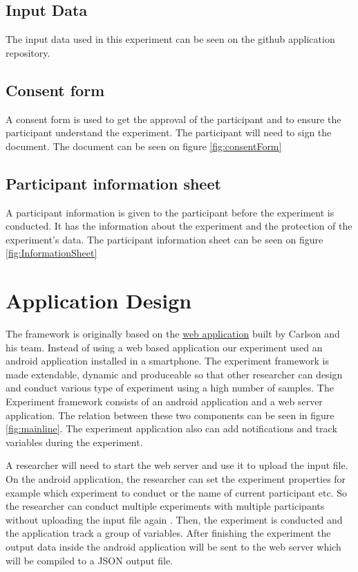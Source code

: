 \subsection{Input Data}
The input data used in this experiment can be seen on the github application repository.


\subsection{Consent form}
A consent form is used to get the approval of the participant and to ensure the participant understand the experiment. The participant will need to sign the document. The document can be seen on figure \ref{fig:consentForm}
\subsection{Participant information sheet}
A participant information is given to the participant before the experiment is conducted. It has the information about the experiment and the protection of the experiment's data. The participant information sheet can be seen on figure \ref{fig:InformationSheet}

\section{Application Design}

The framework is originally based on the \href{https://pennstate.qualtrics.com/jfe/form/SV_dpaKW6wlA1Fr7BX}
{web application} built by Carlson and his team.
Instead of using a web based application our experiment used an android application installed in a smartphone.
The experiment framework is made extendable, dynamic and produceable so that other researcher can design and conduct various type of experiment using a high number of samples.
 The Experiment framework consists of an android application and a web server application.
 The relation between these two components can be seen in figure \ref{fig:mainline}.
 The experiment application also can add notifications and track variables during the experiment.

 A researcher will need to start the web server and use it to upload the input file.
 On the android application, the researcher can set the experiment properties for example which experiment to conduct or the name of current participant etc.
 So the researcher can conduct multiple experiments with multiple participants without uploading the input file again
 . Then, the experiment is conducted and the application track a group of variables.
 After finishing the experiment the output data inside the android application will be sent to the web server which will be compiled to a JSON output file.

